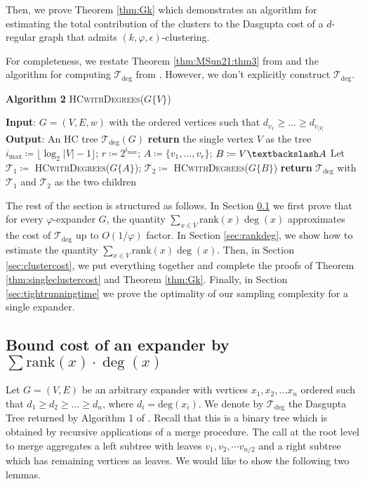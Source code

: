 \documentclass[letterpaper,11pt]{article}
\newcommand{\tdeg}{\mathcal{T}_{\deg}}
\newcommand{\rank}{\mathrm{rank}}
\theoremstyle{plain}
\theoremstyle{definition}
\theoremstyle{remark}
\begin{document}
Then, we prove Theorem \ref{thm:Gk} which demonstrates an algorithm for estimating the total contribution of the clusters to the Dasgupta cost of a $d$-regular graph that admits $(k,\varphi, \epsilon)$-clustering. 
\singleclustercost*

\totalclustercost*

For completeness, we restate Theorem \ref{thm:MSun21:thm3} from \cite{MSun21} and the algorithm for computing $\mathcal{T}_{\deg}$ from \cite{MSun21}. However, we don't explicitly construct $\mathcal{T}_{\deg}$.
\mstedg*
\begin{algorithm}[H]
	\caption*{\textbf{Algorithm 2} \textsc{HCwithDegrees($G\{V\}$)} \cite{MSun21}}
	\begin{algorithmic}[1]
		\STATE \textbf{Input}: $G=(V, E, w)$ with the ordered vertices such that $d_{v_1}\geq \ldots \geq d_{v_{|V|}}$  
		\STATE \textbf{Output}: An HC tree $\mathcal{T}_{\deg}(G)$
		\STATE \textbf{return} the single vertex $V$ as the tree
		\ELSE
		\STATE $i_{\max} \coloneqq \lfloor \log_2{|V|-1} \rfloor$; $r \coloneqq 2^{i_{\max}}$; $A \coloneqq \{v_1,\ldots,v_r\}$; $B \coloneqq V\textbackslash A$
		\STATE Let $\mathcal{T}_1 \coloneqq $ \textsc{HCwithDegrees($G\{A\}$)}; $\mathcal{T}_2 \coloneqq $ \textsc{HCwithDegrees($G\{B\}$)}
		\STATE \textbf{return} $\mathcal{T}_{\deg}$ with $\mathcal{T}_1$ and $\mathcal{T}_2$ as the two children
		\ENDIF
	\end{algorithmic}
\end{algorithm}

The rest of the section is structured as follows. In Section \ref{sec:exp-irr-opt} we first prove that for every $\varphi$-expander $G$, the quantity $\sum_{x \in V} \rank(x) \deg(x) $ approximates the cost of $\mathcal{T}_{\deg}$ up to $O(1/\varphi)$ factor. In Section \ref{sec:rankdeg}, we show how to estimate the quantity $\sum_{x \in V} \rank(x) \deg(x) $. Then, in Section \ref{sec:clustercost}, we put everything together and complete the proofs of Theorem \ref{thm:singleclustercost} and Theorem \ref{thm:Gk}. Finally, in Section \ref{sec:tightrunningtime} we prove the optimality of our sampling complexity for a single expander. 


\subsection{Bound cost of an expander by $\sum \rank(x)\cdot \deg(x)$}\label{sec:exp-irr-opt} 
Let $G = (V,E)$ be an arbitrary expander with vertices $x_1, x_2, \ldots x_n$ ordered such that $d_1 \geq d_2 \geq \ldots \geq d_n$, where $d_i = \text{deg}(x_i)$. We denote
by $\tdeg$ the Dasgupta Tree returned by Algorithm 1 of \cite{MSun21}. Recall that
this is a binary tree which is obtained by recursive applications of a merge procedure.
The call at the root level to merge aggregates a left subtree with leaves 
$v_1, v_2, \cdots v_{n/2}$ and a right subtree which has remaining vertices as leaves.
We would like to show the following two lemmas.
\end{document}

